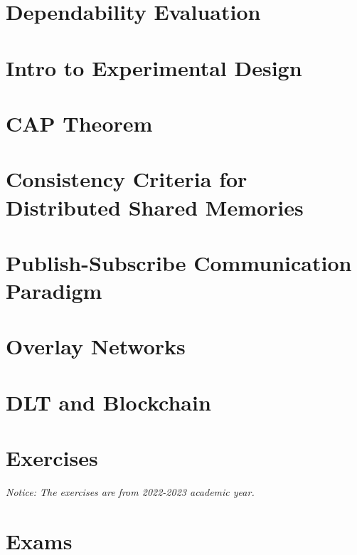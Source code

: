 \documentclass{article}
\begin{document}
	\newpage
	\section{Dependability Evaluation}
	
	\newpage
	\section{Intro to Experimental Design}
	
	\newpage
	\section{CAP Theorem}
	
	\newpage
	\section{Consistency Criteria for Distributed Shared Memories}
	
	\newpage
	\section{Publish-Subscribe Communication Paradigm}
	
	\newpage
	\section{Overlay Networks}
	
	\newpage
	\section{DLT and Blockchain}
	
	\newpage
	\section{Exercises}
	\emph{Notice: The exercises are from 2022-2023 academic year.}
	
	\newpage
	\section{Exams}
	
	
\end{document}
